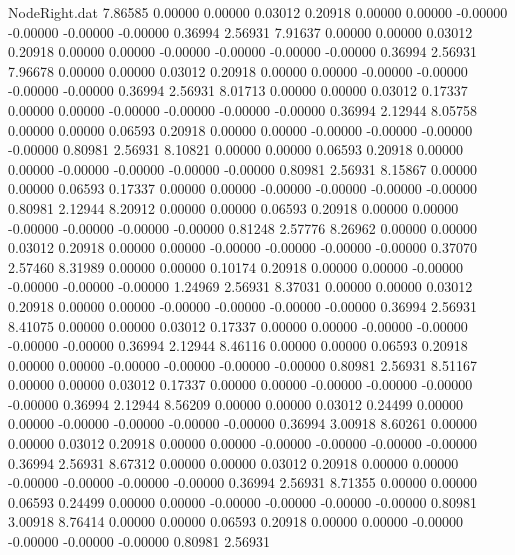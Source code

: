 \begin{filecontents}{NodeRight.dat}
   7.86585    0.00000    0.00000     0.03012    0.20918    0.00000    0.00000   -0.00000   -0.00000   -0.00000   -0.00000    0.36994    2.56931
   7.91637    0.00000    0.00000     0.03012    0.20918    0.00000    0.00000   -0.00000   -0.00000   -0.00000   -0.00000    0.36994    2.56931
   7.96678    0.00000    0.00000     0.03012    0.20918    0.00000    0.00000   -0.00000   -0.00000   -0.00000   -0.00000    0.36994    2.56931
   8.01713    0.00000    0.00000     0.03012    0.17337    0.00000    0.00000   -0.00000   -0.00000   -0.00000   -0.00000    0.36994    2.12944
   8.05758    0.00000    0.00000     0.06593    0.20918    0.00000    0.00000   -0.00000   -0.00000   -0.00000   -0.00000    0.80981    2.56931
   8.10821    0.00000    0.00000     0.06593    0.20918    0.00000    0.00000   -0.00000   -0.00000   -0.00000   -0.00000    0.80981    2.56931
   8.15867    0.00000    0.00000     0.06593    0.17337    0.00000    0.00000   -0.00000   -0.00000   -0.00000   -0.00000    0.80981    2.12944
   8.20912    0.00000    0.00000     0.06593    0.20918    0.00000    0.00000   -0.00000   -0.00000   -0.00000   -0.00000    0.81248    2.57776
   8.26962    0.00000    0.00000     0.03012    0.20918    0.00000    0.00000   -0.00000   -0.00000   -0.00000   -0.00000    0.37070    2.57460
   8.31989    0.00000    0.00000     0.10174    0.20918    0.00000    0.00000   -0.00000   -0.00000   -0.00000   -0.00000    1.24969    2.56931
   8.37031    0.00000    0.00000     0.03012    0.20918    0.00000    0.00000   -0.00000   -0.00000   -0.00000   -0.00000    0.36994    2.56931
   8.41075    0.00000    0.00000     0.03012    0.17337    0.00000    0.00000   -0.00000   -0.00000   -0.00000   -0.00000    0.36994    2.12944
   8.46116    0.00000    0.00000     0.06593    0.20918    0.00000    0.00000   -0.00000   -0.00000   -0.00000   -0.00000    0.80981    2.56931
   8.51167    0.00000    0.00000     0.03012    0.17337    0.00000    0.00000   -0.00000   -0.00000   -0.00000   -0.00000    0.36994    2.12944
   8.56209    0.00000    0.00000     0.03012    0.24499    0.00000    0.00000   -0.00000   -0.00000   -0.00000   -0.00000    0.36994    3.00918
   8.60261    0.00000    0.00000     0.03012    0.20918    0.00000    0.00000   -0.00000   -0.00000   -0.00000   -0.00000    0.36994    2.56931
   8.67312    0.00000    0.00000     0.03012    0.20918    0.00000    0.00000   -0.00000   -0.00000   -0.00000   -0.00000    0.36994    2.56931
   8.71355    0.00000    0.00000     0.06593    0.24499    0.00000    0.00000   -0.00000   -0.00000   -0.00000   -0.00000    0.80981    3.00918
   8.76414    0.00000    0.00000     0.06593    0.20918    0.00000    0.00000   -0.00000   -0.00000   -0.00000   -0.00000    0.80981    2.56931

\end{filecontents}

